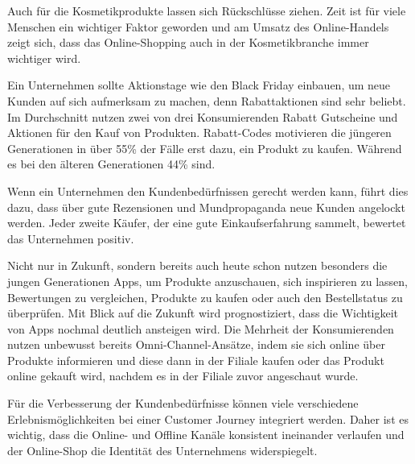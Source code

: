 Auch für die Kosmetikprodukte lassen sich Rückschlüsse ziehen. Zeit ist für viele Menschen ein wichtiger Faktor geworden und am Umsatz des Online-Handels zeigt sich, dass das Online-Shopping auch in der Kosmetikbranche immer wichtiger wird.
\newline

Ein Unternehmen sollte Aktionstage wie den Black Friday einbauen, um neue Kunden auf sich aufmerksam zu machen, denn Rabattaktionen sind sehr beliebt. Im Durchschnitt nutzen zwei von drei Konsumierenden Rabatt Gutscheine und Aktionen für den Kauf von Produkten. Rabatt-Codes motivieren die jüngeren Generationen in über 55\% der Fälle erst dazu, ein Produkt zu kaufen. Während es bei den älteren Generationen 44\% sind.
\newline

Wenn ein Unternehmen den Kundenbedürfnissen gerecht werden kann, führt dies dazu, dass über gute Rezensionen und Mundpropaganda neue Kunden angelockt werden. Jeder zweite Käufer, der eine gute Einkaufserfahrung sammelt, bewertet das Unternehmen positiv.
\newline

Nicht nur in Zukunft, sondern bereits auch heute schon nutzen besonders die jungen Generationen Apps, um Produkte anzuschauen, sich inspirieren zu lassen, Bewertungen zu vergleichen, Produkte zu kaufen oder auch den Bestellstatus zu überprüfen. Mit Blick auf die Zukunft wird prognostiziert, dass die Wichtigkeit von Apps nochmal deutlich ansteigen wird.
Die Mehrheit der Konsumierenden nutzen unbewusst bereits Omni-Channel-Ansätze, indem sie sich online über Produkte informieren und diese dann in der Filiale kaufen oder das Produkt online gekauft wird, nachdem es in der Filiale zuvor angeschaut wurde.
\newline

Für die Verbesserung der Kundenbedürfnisse können viele verschiedene Erlebnismöglichkeiten bei einer Customer Journey integriert werden. Daher ist es wichtig, dass die Online- und Offline Kanäle konsistent ineinander verlaufen und der Online-Shop die Identität des Unternehmens widerspiegelt.

